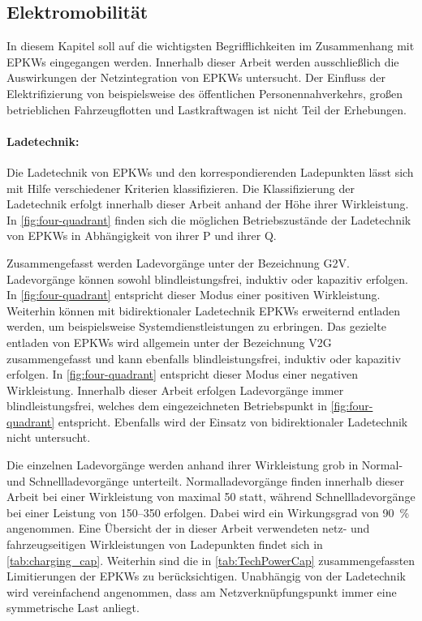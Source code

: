 \subsection{Elektromobilität}

In diesem Kapitel soll auf die wichtigsten Begrifflichkeiten im Zusammenhang mit \glspl{EPKW} eingegangen werden.
Innerhalb dieser Arbeit werden ausschließlich die Auswirkungen der Netzintegration von \glspl{EPKW} untersucht.
Der Einfluss der Elektrifizierung von beispielsweise des öffentlichen Personennahverkehrs, großen betrieblichen Fahrzeugflotten und Lastkraftwagen ist nicht Teil der Erhebungen.


\paragraph{Ladetechnik:}

Die Ladetechnik von \glspl{EPKW} und den korrespondierenden Ladepunkten lässt sich mit Hilfe verschiedener Kriterien klassifizieren.
Die Klassifizierung der Ladetechnik erfolgt innerhalb dieser Arbeit anhand der Höhe ihrer Wirkleistung.
In \autoref{fig:four-quadrant} finden sich die möglichen Betriebszustände der Ladetechnik von \glspl{EPKW} in Abhängigkeit von ihrer \gls{P} und ihrer \gls{Q}.



Zusammengefasst werden Ladevorgänge unter der Bezeichnung \gls{G2V}.
Ladevorgänge können sowohl blindleistungsfrei, induktiv oder kapazitiv erfolgen.
In \autoref{fig:four-quadrant} entspricht dieser Modus einer positiven Wirkleistung.
Weiterhin können mit bidirektionaler Ladetechnik \glspl{EPKW} erweiternd entladen werden, um beispielsweise Systemdienstleistungen zu erbringen.
Das gezielte entladen von \glspl{EPKW} wird allgemein unter der Bezeichnung \gls{V2G} zusammengefasst und kann ebenfalls blindleistungsfrei, induktiv oder kapazitiv erfolgen.
In \autoref{fig:four-quadrant} entspricht dieser Modus einer negativen Wirkleistung. \cite{He2020} 
Innerhalb dieser Arbeit erfolgen Ladevorgänge immer blindleistungsfrei, welches dem eingezeichneten Betriebspunkt in \autoref{fig:four-quadrant} entspricht.
Ebenfalls wird der Einsatz von bidirektionaler Ladetechnik nicht untersucht.\medskip

Die einzelnen Ladevorgänge werden anhand ihrer Wirkleistung grob in Normal- und Schnellladevorgänge unterteilt.
Normalladevorgänge finden innerhalb dieser Arbeit bei einer Wirkleistung von maximal \SI{50}{\kw} statt, während Schnellladevorgänge bei einer Leistung von \SIrange[range-phrase=~{oder}~]{150}{350}{\kw} erfolgen.
Dabei wird ein Wirkungsgrad von \SI{90}{\percent} \cite{EliaGroup2020} angenommen.
Eine Übersicht der in dieser Arbeit verwendeten netz- und fahrzeugseitigen Wirkleistungen von Ladepunkten findet sich in \autoref{tab:charging_cap}.
Weiterhin sind die in \autoref{tab:TechPowerCap} zusammengefassten Limitierungen der \glspl{EPKW} zu berücksichtigen.
Unabhängig von der Ladetechnik wird vereinfachend angenommen, dass am Netzverknüpfungspunkt immer eine symmetrische Last anliegt.

